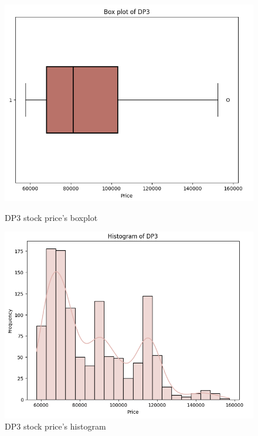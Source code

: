 \documentclass{ieeeojies}
\begin{document}
\begin{figure}[H]
    \centering
    \begin{minipage}{0.23\textwidth}
    \centering
    \includegraphics[width=1\textwidth]{bibliography/Figure/DP3boxplot.png}
    \caption{DP3 stock price's boxplot}
    \label{fig:1}
    \end{minipage}
    \hfill
    \begin{minipage}{0.23\textwidth}
    \centering
    \includegraphics[width=1\textwidth]{bibliography/Figure/DP3hist.png}
    \caption{DP3 stock price's histogram}
    \label{fig:2}
    \end{minipage}
\end{figure}
\end{document}
